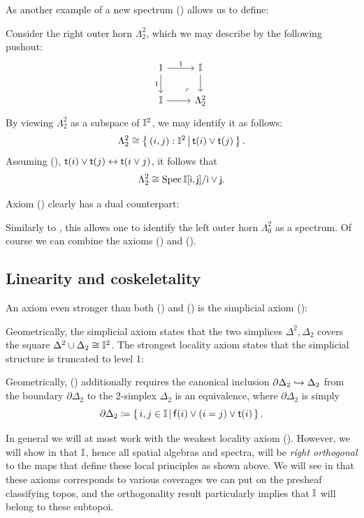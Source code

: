 As another example of a new spectrum (\AxiomL) allows us to define:

\begin{example}\label{exm:hornsober}
  Consider the right outer horn $\Lambda^2_2$, which we may describe by the following pushout:
  \[
    \begin{tikzcd}
      1 \ar[d, "1"'] \ar[r, "1"] & \mbb{I} \ar[d] \\
      \mbb{I} \ar[r] & \Lambda^2_2
      \arrow["\lrcorner"{anchor=center, pos=0.125, rotate=180}, draw=none, from=2-2, to=1-1]
    \end{tikzcd}
  \]
  By viewing $\Lambda^2_2$ as a subspace of $\mathbb{I}^2$, we may identify it as follows:
  \[ \Lambda^2_2 \cong \left\{\,(i,j) : \mathbb{I}^2\,\middle|\,\mathsf{t}(i) \vee \mathsf{t}(j)\,\right\}\text{.} \]
  Assuming (\AxiomL), $\mathsf{t}(i) \vee \mathsf{t}(j) \leftrightarrow \mathsf{t}(i\vee j)$, it follows that 
  \[ \Lambda^2_2 \cong \operatorname{Spec} \mathbb{I}[\mathsf{i},\mathsf{j}]/\mathsf{i} \vee \mathsf{j}\text{.} \]
\end{example}

Axiom (\AxiomL) clearly has a dual counterpart:


\PrintAxiomCL

Similarly to , this allows one to identify the left outer horn $\Lambda^2_0$ as a spectrum. Of course we can combine the axioms (\AxiomL) and (\AxiomCL). 

\subsection{Linearity and coskeletality}\label{sec:linearity-and-coskeletality}

An axiom even stronger than both (\AxiomL) and (\AxiomCL) is the simplicial axiom (\AxiomSL):

\PrintAxiomSL

Geometrically, the simplicial axiom states that the two simplices $\Delta^2,\Delta_2$ covers the square $\Delta^2 \cup \Delta_2 \cong \mathbb{I}^2$.
The strongest locality axiom states that the simplicial structure is truncated to level 1:


\PrintAxiomOneCS

Geometrically, (\AxiomOneCS) additionally requires the canonical inclusion $\partial\Delta_2 \hookrightarrow \Delta_2$ from the boundary $\partial\Delta_2$ to the 2-simplex $\Delta_2$ is an equivalence, where $\partial\Delta_2$ is simply
\[ \partial\Delta_2 \coloneq \left\{\,i,j \in \mathbb{I}\,\middle|\,\mathsf{f}(i) \vee (i = j) \vee \mathsf{t}(i)\,\right\}\text{.} \]

In general we will at most work with the weakest locality axiom (\AxiomNT). However, we will show in  that $\mathbb{I}$, hence all spatial algebras and spectra, will be \emph{right orthogonal} to the maps that define these local principles as shown above. We will see in  that these axioms corresponds to various coverages we can put on the presheaf classifying topos, and the orthogonality result particularly implies that $\mathbb{I}$ will belong to these subtopoi.


